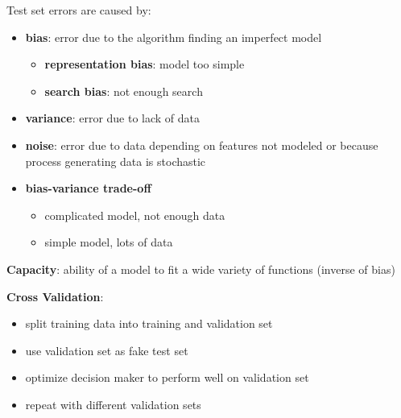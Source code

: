 \documentclass[11pt]{article}
\begin{document}
\begin{center}
\end{center}

Test set errors are caused by:
\begin{itemize}
\item \textbf{bias}: error due to the algorithm finding an imperfect model
\begin{itemize}
\item \textbf{representation bias}: model too simple
\item \textbf{search bias}: not enough search
\end{itemize}
\item \textbf{variance}: error due to lack of data
\item \textbf{noise}: error due to data depending on features not modeled or because process generating
data is stochastic
\item \textbf{bias-variance trade-off}
\begin{itemize}
\item complicated model, not enough data
\item simple model, lots of data
\end{itemize}
\end{itemize}

\textbf{Capacity}: ability of a model to fit a wide variety of functions (inverse of bias)

\textbf{Cross Validation}:
\begin{itemize}
\item split training data into training and validation set
\item use validation set as fake test set
\item optimize decision maker to perform well on validation set
\item repeat with different validation sets
\end{itemize}
\end{document}
